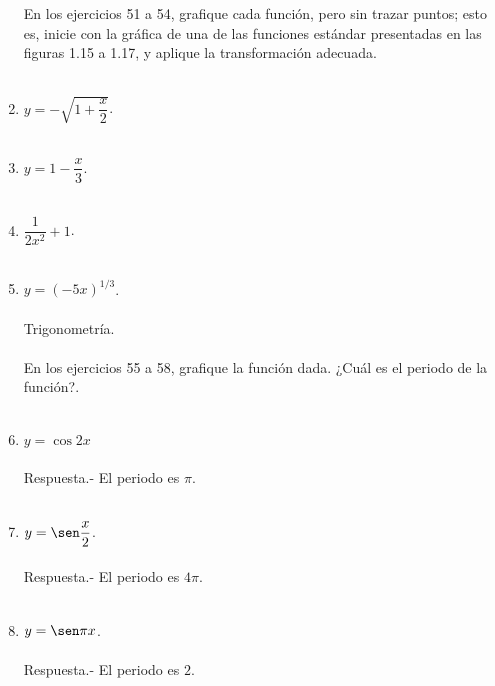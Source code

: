 \begin{enumerate}
\begin{enumerate}[\bfseries a)]
\end{enumerate}
En los ejercicios 51 a 54, grafique cada función, pero sin trazar puntos; esto es, inicie con la gráfica de una de las funciones estándar presentadas en las figuras 1.15 a 1.17, y aplique la transformación adecuada.\\\\

\item $y = - \sqrt{1 + \dfrac{x}{2}}$.\\\\

\item $y = 1 - \dfrac{x}{3}$.\\\\

\item $\dfrac{1}{2x^2} + 1$.\\\\

\item $y = (-5x)^{1/3}$.\\\\

Trigonometría.\\\\
En los ejercicios 55 a 58, grafique la función dada. ¿Cuál es el periodo de la función?.\\\\

\item $y = \cos 2x$\\\\
    Respuesta.-\; El periodo es $\pi$.\\\\

\item $y = \sen \dfrac{x}{2}$.\\\\
    Respuesta.-\; El periodo es $4\pi$.\\\\

\item $y = \sen \pi x$.\\\\
    Respuesta.-\; El periodo es $2$.\\\\


\end{enumerate}
